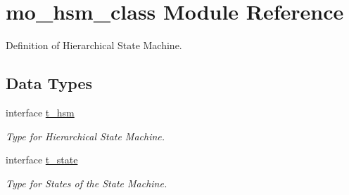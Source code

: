\hypertarget{namespacemo__hsm__class}{}\section{mo\+\_\+hsm\+\_\+class Module Reference}
\label{namespacemo__hsm__class}


Definition of Hierarchical State Machine.  


\subsection*{Data Types}
\begin{DoxyCompactItemize}
\item 
interface \hyperlink{structmo__hsm__class_1_1t__hsm}{t\+\_\+hsm}
\begin{DoxyCompactList}\small\item\em Type for Hierarchical State Machine. \end{DoxyCompactList}\item 
interface \hyperlink{structmo__hsm__class_1_1t__state}{t\+\_\+state}
\begin{DoxyCompactList}\small\item\em Type for States of the State Machine. \end{DoxyCompactList}\end{DoxyCompactItemize}
